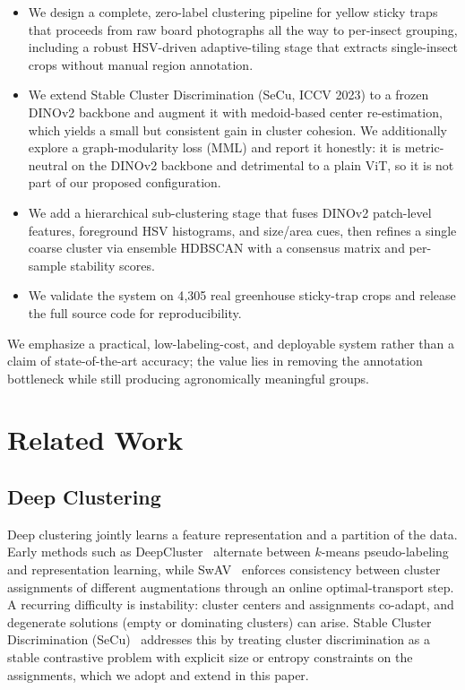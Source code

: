 \documentclass[10pt,a4paper,twocolumn]{article}
\begin{document}
\begin{itemize}[leftmargin=1.2em,itemsep=2pt,topsep=2pt]
\item We design a complete, zero-label clustering pipeline for yellow sticky traps that proceeds from raw board photographs all the way to per-insect grouping, including a robust HSV-driven adaptive-tiling stage that extracts single-insect crops without manual region annotation.
\item We extend Stable Cluster Discrimination (SeCu, ICCV 2023) to a frozen DINOv2 backbone and augment it with medoid-based center re-estimation, which yields a small but consistent gain in cluster cohesion. We additionally explore a graph-modularity loss (MML) and report it honestly: it is metric-neutral on the DINOv2 backbone and detrimental to a plain ViT, so it is not part of our proposed configuration.
\item We add a hierarchical sub-clustering stage that fuses DINOv2 patch-level features, foreground HSV histograms, and size/area cues, then refines a single coarse cluster via ensemble HDBSCAN with a consensus matrix and per-sample stability scores.
\item We validate the system on 4{,}305 real greenhouse sticky-trap crops and release the full source code for reproducibility.
\end{itemize}

We emphasize a practical, low-labeling-cost, and deployable system rather than a claim of state-of-the-art accuracy; the value lies in removing the annotation bottleneck while still producing agronomically meaningful groups.

\section{Related Work}

\subsection{Deep Clustering}
Deep clustering jointly learns a feature representation and a partition of the data. Early methods such as DeepCluster~\cite{caron2018deepcluster} alternate between $k$-means pseudo-labeling and representation learning, while SwAV~\cite{caron2020swav} enforces consistency between cluster assignments of different augmentations through an online optimal-transport step. A recurring difficulty is instability: cluster centers and assignments co-adapt, and degenerate solutions (empty or dominating clusters) can arise. Stable Cluster Discrimination (SeCu)~\cite{qian2023secu} addresses this by treating cluster discrimination as a stable contrastive problem with explicit size or entropy constraints on the assignments, which we adopt and extend in this paper.
\end{document}
